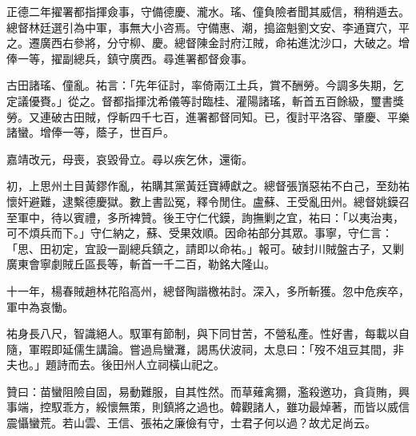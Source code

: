 \begin{pinyinscope}
正德二年擢署都指揮僉事，守備德慶、瀧水。瑤、僮負險者聞其威信，稍稍遁去。總督林廷選引為中軍，事無大小咨焉。守備惠、潮，搗盜魁劉文安、李通寶穴，平之。遷廣西右參將，分守柳、慶。總督陳金討府江賊，命祐進沈沙口，大破之。增俸一等，擢副總兵，鎮守廣西。尋進署都督僉事。

古田諸瑤、僮亂。祐言：「先年征討，率倚兩江土兵，賞不酬勞。今調多失期，乞定議優賚。」從之。督都指揮沈希儀等討臨桂、灌陽諸瑤，斬首五百餘級，璽書獎勞。又連破古田賊，俘斬四千七百，進署都督同知。已，復討平洛容、肇慶、平樂諸蠻。增俸一等，蔭子，世百戶。

嘉靖改元，母喪，哀毀骨立。尋以疾乞休，還衛。

初，上思州土目黃鏐作亂，祐購其黨黃廷寶縛獻之。總督張嵿惡祐不白己，至劾祐懷奸避難，逮繫德慶獄。數上書訟冤，釋令閒住。盧蘇、王受亂田州。總督姚鏌召至軍中，待以賓禮，多所裨贊。後王守仁代鏌，詢撫剿之宜，祐曰：「以夷治夷，可不煩兵而下。」守仁納之，蘇、受果效順。因命祐部分其眾。事寧，守仁言：「思、田初定，宜設一副總兵鎮之，請即以命祐。」報可。破封川賊盤古子，又剿廣東會寧劇賊丘區長等，斬首一千二百，勒銘大隆山。

十一年，楊春賊趙林花陷高州，總督陶諧檄祐討。深入，多所斬獲。忽中危疾卒，軍中為哀慟。

祐身長八尺，智識絕人。馭軍有節制，與下同甘苦，不營私產。性好書，每載以自隨，軍暇即延儒生講論。嘗過烏蠻灘，謁馬伏波祠，太息曰：「歿不俎豆其間，非夫也。」題詩而去。後田州人立祠橫山祀之。

贊曰：苗蠻阻險自固，易動難服，自其性然。而草薙禽獮，濫殺邀功，貪貨賄，興事端，控馭乖方，綏懷無策，則鎮將之過也。韓觀諸人，雖功最焯著，而皆以威信震懾蠻荒。若山雲、王信、張祐之廉儉有守，士君子何以過？故尤足尚云。


\end{pinyinscope}